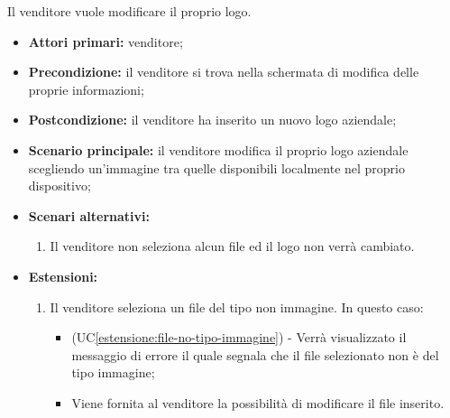Il venditore vuole modificare il proprio logo.
\begin{itemize}
    \item \textbf{Attori primari:} venditore;
    \item \textbf{Precondizione:} il venditore si trova nella schermata di modifica delle proprie informazioni;
    \item \textbf{Postcondizione:} il venditore ha inserito un nuovo logo aziendale;
    \item \textbf{Scenario principale:} il venditore modifica il proprio logo aziendale scegliendo un'immagine tra quelle disponibili localmente nel proprio dispositivo;
    \item \textbf{Scenari alternativi:}
    \begin{enumerate}[label=\lett]
    	\item Il venditore non seleziona alcun file ed il logo non verrà cambiato.
    \end{enumerate}
    \item \textbf{Estensioni:}
    \begin{enumerate}[label=\lett]
    	\item Il venditore seleziona un file del tipo non immagine. In questo caso:
    	\begin{itemize}
    		\item (UC\ref{estensione:file-no-tipo-immagine}) - Verrà visualizzato il messaggio di errore il quale segnala che il file selezionato non è del tipo immagine;
    		\item Viene fornita al venditore la possibilità di modificare il file inserito.
    	\end{itemize}
    \end{enumerate}
\end{itemize}

\label{modifica-informazioni-venditore.nome-azienda}

